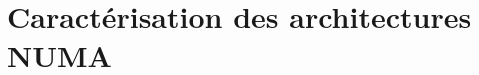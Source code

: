 

\chapter{Caractérisation des architectures NUMA}\label{chap:contrib:characterization}
\chaptertoc




